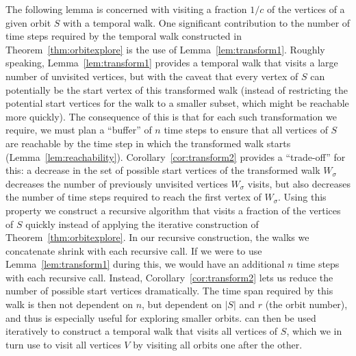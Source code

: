 \documentclass[10pt,a4paper]{article}
\begin{document}
    {The following lemma is concerned with visiting a fraction $1/c$
of the vertices of a given orbit $S$ with a temporal walk. One significant
contribution to the number of time steps required by the temporal walk
constructed in Theorem~\ref{thm:orbitexplore} is the use of
Lemma~\ref{lem:transform1}. Roughly speaking, Lemma~\ref{lem:transform1}
provides a temporal walk that visits a large number of unvisited vertices, but
with the caveat that every vertex of $S$ can potentially be the start vertex of this
transformed walk (instead of restricting the potential start vertices
for the walk to a smaller subset, which might be reachable more quickly).
The consequence of this is that for each such transformation we require,
we must plan a ``buffer'' of $n$ time steps to ensure that all vertices of $S$ are
reachable by the time step in which the transformed walk starts (Lemma~\ref{lem:reachability}).
Corollary~\ref{cor:transform2} provides a ``trade-off'' for this: a decrease in
the set of possible start vertices of the transformed walk $W_{\sigma}$
decreases the number of previously unvisited vertices $W_{\sigma}$ visits, but
also decreases the number of time steps required to reach the first vertex of
$W_{\sigma}$. Using this property we construct a recursive algorithm that visits
a fraction of the vertices of $S$ quickly instead of applying the iterative construction of
Theorem~\ref{thm:orbitexplore}. In our recursive construction,
the walks we concatenate shrink with each recursive call. If we were to use
Lemma~\ref{lem:transform1} during this, we would have an additional $n$ time
steps with each recursive call. Instead, Corollary~\ref{cor:transform2} lets us
reduce the number of possible start vertices dramatically. The time span required
by this walk is then not dependent on $n$, but dependent on $|S|$ and $r$ (the
orbit number), and thus is especially useful for exploring smaller orbits.
can
then be used iteratively to construct a
temporal walk that visits all vertices of $S$, which we in turn use to visit all
vertices $V$ by visiting all orbits one after the other. }


\newcommand{\ww}{u}
\end{document}
